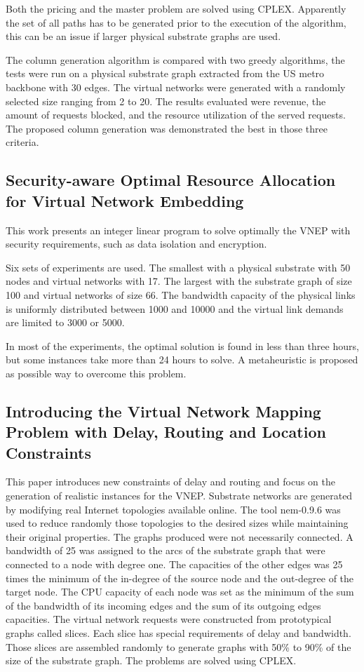 Both the pricing and the master problem are solved using CPLEX\@. Apparently the set of all paths has to be generated prior to the execution of the algorithm, this can be an issue if larger physical substrate graphs are used.

The column generation algorithm is compared with two greedy algorithms, the tests were run on a physical substrate graph extracted from the US metro backbone with 30 edges. The virtual networks were generated with a randomly selected size ranging from 2 to 20. The results evaluated were revenue, the amount of requests blocked, and the resource utilization of the served requests. The proposed column generation was demonstrated the best in those three criteria.

\subsection{Security-aware Optimal Resource Allocation for Virtual Network Embedding \cite{Buriol:2012}}
This work presents an integer linear program to solve optimally the VNEP with security requirements, such as data isolation and encryption.

Six sets of experiments are used. The smallest with a physical substrate with 50 nodes and virtual networks with 17. The largest with the substrate graph of size 100 and virtual networks of size 66. The bandwidth capacity of the physical links is uniformly distributed between 1000 and 10000 and the virtual link demands are limited to 3000 or 5000.

In most of the experiments, the optimal solution is found in less than three hours, but some instances take more than 24 hours to solve. A metaheuristic is proposed as possible way to overcome this problem.

\subsection{Introducing the Virtual Network Mapping Problem with Delay, Routing and Location Constraints \cite{infuhr:2011}}
This paper introduces new constraints of delay and routing and focus on the generation of realistic instances for the VNEP\@. Substrate networks are generated by modifying real Internet topologies available online. The tool nem-0.9.6 was used to reduce randomly those topologies to the desired sizes while maintaining their original properties. The graphs produced were not necessarily connected. A bandwidth of 25 was assigned to the arcs of the substrate graph that were connected to a node with degree one. The capacities of the other edges was 25 times the minimum of the in-degree of the source node and the out-degree of the target node. The CPU capacity of each node was set as the minimum of the sum of the bandwidth of its incoming edges and the sum of its outgoing edges capacities. The virtual network requests were constructed from prototypical graphs called slices. Each slice has special requirements of delay and bandwidth. Those slices are assembled randomly to generate graphs with 50\% to 90\% of the size of the substrate graph. The problems are solved using CPLEX.

